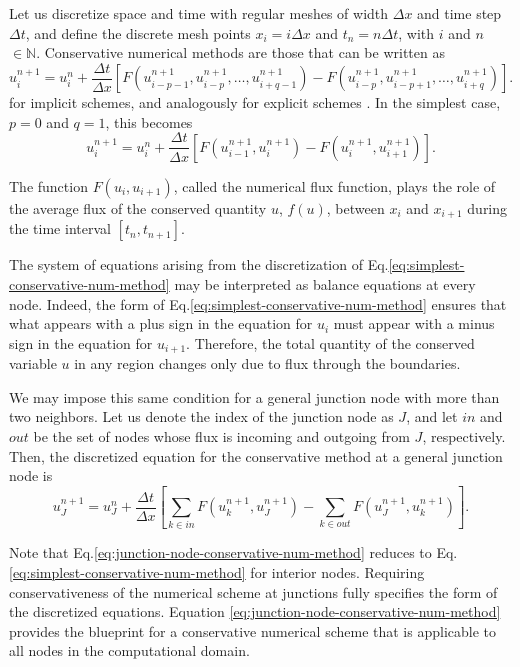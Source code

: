 \documentclass[bg, manuscript]{copernicus}
\begin{document}
Let us discretize space and time with regular meshes of width $\Delta x$ and time step $\Delta t$, and define the discrete mesh points $x_i=i\Delta x$ and $t_n=n\Delta t$, with $i$ and $n$ $\in \mathbb{N}$.
Conservative numerical methods are those that can be written as
\begin{equation} \label{eq:general-discretization-consesrvative-pde}
u_i^{n+1} = u_i^n + \frac{\Delta t}{\Delta x} \left[F(u^{n+1}_{i-p-1}, u^{n+1}_{i-p}, \dots, u^{n+1}_{i+q-1}) - F(u^{n+1}_{i-p}, u^{n+1}_{i-p+1}, \dots, u^{n+1}_{i+q})\right]. 
\end{equation}
for implicit schemes, and analogously for explicit schemes \citep{levequeNumericalMethodsConservation1992}.
In the simplest case, $p = 0$ and $q=1$, this becomes
\begin{equation} \label{eq:simplest-conservative-num-method}
u_i^{n+1} = u_i^n + \frac{\Delta t}{\Delta x} \left[F(u^{n+1}_{i-1}, u^{n+1}_{i}) - F(u^{n+1}_{i}, u^{n+1}_{i+1})\right].
\end{equation}

The function $F(u_i, u_{i+1})$, called the numerical flux function, plays the role of the average   flux of the conserved quantity $u$, $f(u)$, between $x_i$ and $x_{i+1}$ during the time interval $[t_n, t_{n+1}]$.

The system of equations arising from the discretization of Eq.\eqref{eq:simplest-conservative-num-method} may be interpreted as balance equations at every node.
Indeed, the form of Eq.\eqref{eq:simplest-conservative-num-method} ensures that what appears with a plus sign in the equation for $u_i$  must appear with a minus sign in the equation for $u_{i+1}$.
Therefore, the total quantity of the conserved variable $u$ in any region changes only due to flux through the boundaries.

We may impose this same condition for a general junction node with more than two neighbors.
Let us denote the index of the junction node as $J$, and let $in$ and $out$ be the set of nodes whose flux is incoming and outgoing from $J$, respectively.
Then, the discretized equation for the conservative method at a general junction node is
\begin{equation}
    \label{eq:junction-node-conservative-num-method}
    u^{n+1}_J = u^{n}_J + \frac{\Delta t}{\Delta x}\left[ \sum_{k\in in}F\left(u^{n+1}_k, u^{n+1}_J\right) - \sum_{k\in out}F\left(u^{n+1}_J, u^{n+1}_k\right) \right].
\end{equation}

Note that Eq.\eqref{eq:junction-node-conservative-num-method} reduces to Eq.\eqref{eq:simplest-conservative-num-method} for interior nodes.
Requiring conservativeness of the numerical scheme at junctions fully specifies the form of the discretized equations.   
Equation \eqref{eq:junction-node-conservative-num-method} provides the blueprint for a conservative numerical scheme  that is applicable to all nodes in the computational domain.
\end{document}

